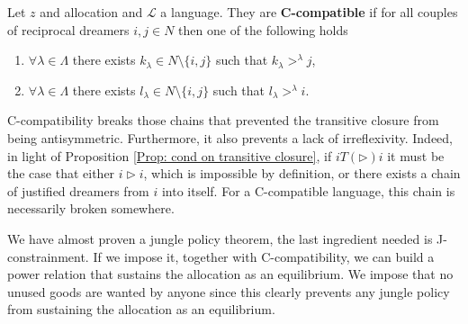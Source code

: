 \begin{definition}
    Let $z$ and allocation and $\mathcal{L}$ a language. They are \textbf{C-compatible} if for all couples of reciprocal dreamers $i,j\in N$ then one of the following holds

    \begin{enumerate}
        \item $\forall \lambda\in \Lambda$ there exists $k_{\lambda}\in N\setminus\{i,j\}$ such that $k_{\lambda}>^{\lambda}j$,
        \item $\forall \lambda\in \Lambda$ there exists $l_{\lambda}\in N\setminus\{i,j\}$ such that $l_{\lambda}>^{\lambda}i$.
    \end{enumerate}
\end{definition}

C-compatibility breaks those chains that prevented the transitive closure from being antisymmetric. Furthermore, it also prevents a lack of irreflexivity. Indeed, in light of Proposition \ref{Prop: cond on transitive closure}, if $iT(\triangleright)i$ it must be the case that either $i\triangleright i$, which is impossible by definition, or there exists a chain of justified dreamers from $i$ into itself. For a C-compatible language, this chain is necessarily broken somewhere. 

We have almost proven a jungle policy theorem, the last ingredient needed is J-constrainment. If we impose it, together with C-compatibility, we can build a power relation that sustains the allocation as an equilibrium. We impose that no unused goods are wanted by anyone since this clearly prevents any jungle policy from sustaining the allocation as an equilibrium.








